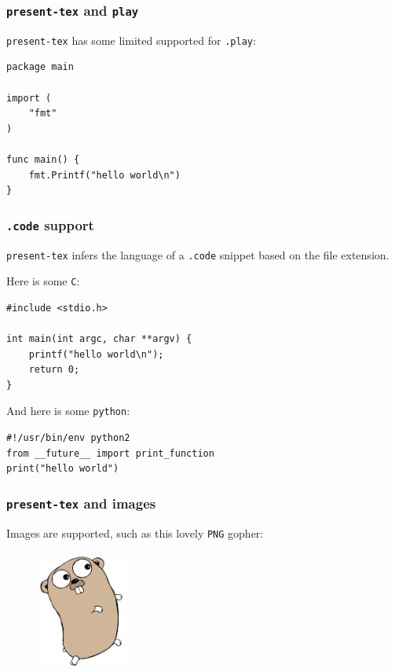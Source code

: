 \documentclass[9pt]{beamer}
\begin{document}
\begin{frame}[fragile]
\frametitle{\texttt{present-tex} and \texttt{play}}

\texttt{present-tex} has some limited supported for \texttt{.play}:



\begin{verbatim}
package main

import (
	"fmt"
)

func main() {
	fmt.Printf("hello world\n")
}

\end{verbatim}

\end{frame}

\begin{frame}[fragile]
\frametitle{\texttt{.code} support}

\texttt{present-tex} infers the language of a \texttt{.code} snippet based on the file extension.

Here is some \texttt{C}:



\begin{verbatim}
#include <stdio.h>

int main(int argc, char **argv) {
	printf("hello world\n");
	return 0;
}

\end{verbatim}

And here is some \texttt{python}:



\begin{verbatim}
#!/usr/bin/env python2
from __future__ import print_function
print("hello world")

\end{verbatim}

\end{frame}

\begin{frame}[fragile]
\frametitle{\texttt{present-tex} and images}

Images are supported, such as this lovely \texttt{PNG} gopher:



\begin{figure}[h]
\begin{center}
\includegraphics[width=3cm,height=4cm]{_figs/gopher.png}
\end{center}

\end{figure}

\end{frame}
\end{document}
